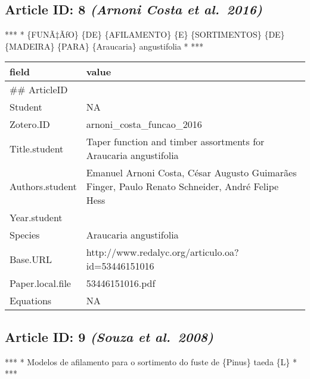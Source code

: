 \documentclass[]{article}
\begin{document}
\hypertarget{article-id-8-arnoni-costa-et-al.2016}{%
\subsection{\texorpdfstring{Article ID: 8 \textbf{\emph{(Arnoni Costa et
al.~2016)}}}{Article ID: 8 (Arnoni Costa et al.~2016)}}\label{article-id-8-arnoni-costa-et-al.2016}}

*** * \{FUNÃ‡ÃƒO\} \{DE\} \{AFILAMENTO\} \{E\} \{SORTIMENTOS\} \{DE\}
\{MADEIRA\} \{PARA\} \{Araucaria\} angustifolia * ***

\begin{table}[H]
\centering
\begin{tabular}{>{\raggedright\arraybackslash}p{2cm}>{\raggedright\arraybackslash}p{8cm}}
\toprule
field & value\\
\midrule
\#\# ArticleID & 8\\
Student & NA\\
Zotero.ID & arnoni\_costa\_funcao\_2016\\
Title.student & Taper function and timber assortments for Araucaria angustifolia\\
Authors.student & Emanuel Arnoni Costa, César Augusto Guimarães Finger, Paulo Renato Schneider, André Felipe Hess\\
\addlinespace
Year.student & 2016\\
Species & Araucaria angustifolia\\
Base.URL & http://www.redalyc.org/articulo.oa?id=53446151016\\
Paper.local.file & 53446151016.pdf\\
Equations & NA\\
\bottomrule
\end{tabular}
\end{table}

\hypertarget{article-id-9-souza-et-al.2008}{%
\subsection{\texorpdfstring{Article ID: 9 \textbf{\emph{(Souza et
al.~2008)}}}{Article ID: 9 (Souza et al.~2008)}}\label{article-id-9-souza-et-al.2008}}

*** * Modelos de afilamento para o sortimento do fuste de \{Pinus\}
taeda \{L\} * ***
\end{document}
